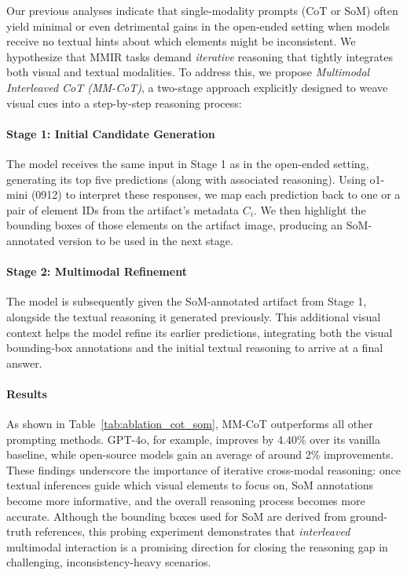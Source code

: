 Our previous analyses indicate that single-modality prompts (CoT or SoM) often yield minimal or even detrimental gains in the open-ended setting when models receive no textual hints about which elements might be inconsistent. We hypothesize that MMIR tasks demand \textit{iterative} reasoning that tightly integrates both visual and textual modalities. To address this, we propose \emph{Multimodal Interleaved CoT (MM-CoT)}, a two-stage approach explicitly designed to weave visual cues into a step-by-step reasoning process:

\paragraph{Stage 1: Initial Candidate Generation}  
The model receives the same input in Stage 1 as in the open-ended setting, generating its top five predictions (along with associated reasoning). Using o1-mini (0912) to interpret these responses, we map each prediction back to one or a pair of element IDs from the artifact’s metadata \(C_i\). We then highlight the bounding boxes of those elements on the artifact image, producing an SoM-annotated version to be used in the next stage.

\paragraph{Stage 2: Multimodal Refinement}  
The model is subsequently given the SoM-annotated artifact from Stage 1, alongside the textual reasoning it generated previously. This additional visual context helps the model refine its earlier predictions, integrating both the visual bounding-box annotations and the initial textual reasoning to arrive at a final answer.

\paragraph{Results}  
As shown in Table~\ref{tab:ablation_cot_som}, MM-CoT outperforms all other prompting methods. GPT-4o, for example, improves by 4.40\% over its vanilla baseline, while open-source models gain an average of around 2\% improvements. These findings underscore the importance of iterative cross-modal reasoning: once textual inferences guide which visual elements to focus on, SoM annotations become more informative, and the overall reasoning process becomes more accurate. Although the bounding boxes used for SoM are derived from ground-truth references, this probing experiment demonstrates that \emph{interleaved} multimodal interaction is a promising direction for closing the reasoning gap in challenging, inconsistency-heavy scenarios.